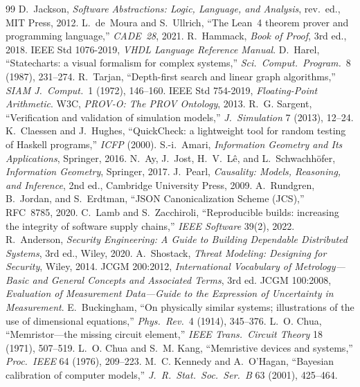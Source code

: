 \begin{thebibliography}{99}
 D.~Jackson, \emph{Software Abstractions: Logic, Language, and Analysis}, rev.\ ed., MIT Press, 2012.
 L.~de~Moura and S.~Ullrich, ``The Lean~4 theorem prover and programming language,'' \emph{CADE~28}, 2021.
 R.~Hammack, \emph{Book of Proof}, 3rd ed., 2018.
 IEEE Std 1076-2019, \emph{VHDL Language Reference Manual}.
 D.~Harel, ``Statecharts: a visual formalism for complex systems,'' \emph{Sci.\ Comput.\ Program.}\ 8 (1987), 231--274.
 R.~Tarjan, ``Depth-first search and linear graph algorithms,'' \emph{SIAM J.\ Comput.}\ 1 (1972), 146--160.
 IEEE Std 754-2019, \emph{Floating-Point Arithmetic}.
 W3C, \emph{PROV-O: The PROV Ontology}, 2013.
 R.~G. Sargent, ``Verification and validation of simulation models,'' \emph{J.\ Simulation} 7 (2013), 12--24.
 K.~Claessen and J.~Hughes, ``QuickCheck: a lightweight tool for random testing of Haskell programs,'' \emph{ICFP} (2000).
 S.-i.~Amari, \emph{Information Geometry and Its Applications}, Springer, 2016.
 N.~Ay, J.~Jost, H.~V.~L\^e, and L.~Schwachh\"ofer, \emph{Information Geometry}, Springer, 2017.
 J.~Pearl, \emph{Causality: Models, Reasoning, and Inference}, 2nd ed., Cambridge University Press, 2009.
 A.~Rundgren, B.~Jordan, and S.~Erdtman, ``JSON Canonicalization Scheme (JCS),'' RFC~8785, 2020.
 C.~Lamb and S.~Zacchiroli, ``Reproducible builds: increasing the integrity of software supply chains,'' \emph{IEEE Software} 39(2), 2022.
 R.~Anderson, \emph{Security Engineering: A Guide to Building Dependable Distributed Systems}, 3rd ed., Wiley, 2020.
 A.~Shostack, \emph{Threat Modeling: Designing for Security}, Wiley, 2014.
 JCGM 200:2012, \emph{International Vocabulary of Metrology---Basic and General Concepts and Associated Terms}, 3rd ed.
 JCGM 100:2008, \emph{Evaluation of Measurement Data---Guide to the Expression of Uncertainty in Measurement}.
 E.~Buckingham, ``On physically similar systems; illustrations of the use of dimensional equations,'' \emph{Phys.\ Rev.}\ 4 (1914), 345--376.
 L.~O. Chua, ``Memristor---the missing circuit element,'' \emph{IEEE Trans.\ Circuit Theory} 18 (1971), 507--519.
 L.~O. Chua and S.~M. Kang, ``Memristive devices and systems,'' \emph{Proc.\ IEEE} 64 (1976), 209--223.
 M.~C. Kennedy and A.~O'Hagan, ``Bayesian calibration of computer models,'' \emph{J.\ R.\ Stat.\ Soc.\ Ser.~B} 63 (2001), 425--464.

\end{thebibliography}
